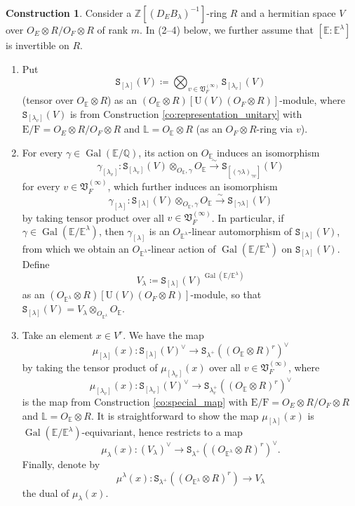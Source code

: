 \documentclass[12pt]{amsart}
\numberwithin{equation}{section}
\theoremstyle{plain}
\theoremstyle{definition}
\newtheorem{construction}[proposition]{Construction}
\theoremstyle{remark}
\renewcommand{\d}[1]{\mathbb{#1}}
\newcommand{\f}[1]{\mathfrak{#1}}
\renewcommand{\r}[1]{\mathrm{#1}}
\renewcommand{\(}{\left(}
\renewcommand{\)}{\right)}
\newcommand{\dE}{\d E}
\newcommand{\dL}{\d L}
\newcommand{\dQ}{\d Q}
\newcommand{\dZ}{\d Z}
\newcommand{\fV}{\f V}
\newcommand{\rE}{\r E}
\newcommand{\rF}{\r F}
\newcommand{\rU}{\r U}
\newcommand{\tS}{\mathtt{S}}
\DeclareMathOperator{\Gal}{Gal}
\begin{document}
\begin{construction}\label{co:harmonic_function}
Consider a $\dZ[(D_E B_\lambda)^{-1}]$-ring $R$ and a hermitian space $V$ over $O_E\otimes R/O_F\otimes R$ of rank $m$. In (2--4) below, we further assume that $[\dE:\dE^\lambda]$ is invertible on $R$.
\begin{enumerate}
  \item Put
      \[
      \tS_{[\lambda]}(V)\coloneqq\bigotimes_{v\in\fV_F^{(\infty)}}\tS_{[\lambda_v]}(V)
      \]
      (tensor over $O_\dE\otimes R$) as an $(O_\dE\otimes R)[\rU(V)(O_F\otimes R)]$-module, where $\tS_{[\lambda_v]}(V)$ is from Construction \ref{co:representation_unitary} with $\rE/\rF=O_E\otimes R/O_F\otimes R$ and $\dL=O_\dE\otimes R$ (as an $O_F\otimes R$-ring via $v$).

  \item For every $\gamma\in\Gal(\dE/\dQ)$, its action on $O_\dE$ induces an isomorphism
      \[
      \gamma_{[\lambda_v]}\colon\tS_{[\lambda_v]}(V)\otimes_{O_\dE,\gamma}O_\dE\xrightarrow\sim\tS_{[(\gamma\lambda)_{\gamma v}]}(V)
      \]
      for every $v\in\fV_F^{(\infty)}$, which further induces an isomorphism
      \[
      \gamma_{[\lambda]}\colon\tS_{[\lambda]}(V)\otimes_{O_\dE,\gamma}O_\dE\xrightarrow\sim\tS_{[\gamma\lambda]}(V)
      \]
      by taking tensor product over all $v\in\fV_F^{(\infty)}$. In particular, if $\gamma\in\Gal(\dE/\dE^\lambda)$, then $\gamma_{[\lambda]}$ is an $O_{\dE^\lambda}$-linear automorphism of $\tS_{[\lambda]}(V)$, from which we obtain an $O_{\dE^\lambda}$-linear action of $\Gal(\dE/\dE^\lambda)$ on $\tS_{[\lambda]}(V)$. Define
      \[
      V_\lambda\coloneqq\tS_{[\lambda]}(V)^{\Gal(\dE/\dE^\lambda)}
      \]
      as an $(O_{\dE^\lambda}\otimes R)[\rU(V)(O_F\otimes R)]$-module, so that $\tS_{[\lambda]}(V)=V_\lambda\otimes_{O_{\dE^\lambda}}O_\dE$.

  \item Take an element $x\in V^r$. We have the map
      \[
      \mu_{[\lambda]}(x)\colon\tS_{[\lambda]}(V)^\vee\to\tS_{\lambda^+}((O_\dE\otimes R)^r)^\vee
      \]
      by taking the tensor product of $\mu_{[\lambda_v]}(x)$ over all $v\in\fV_F^{(\infty)}$, where
      \[
      \mu_{[\lambda_v]}(x)\colon\tS_{[\lambda_v]}(V)^\vee\to\tS_{\lambda_v^+}((O_\dE\otimes R)^r)^\vee
      \]
      is the map from Construction \ref{co:special_map} with $\rE/\rF=O_E\otimes R/O_F\otimes R$ and $\dL=O_\dE\otimes R$. It is straightforward to show the map $\mu_{[\lambda]}(x)$ is $\Gal(\dE/\dE^\lambda)$-equivariant, hence restricts to a map
      \[
      \mu_\lambda(x)\colon(V_\lambda)^\vee\to\tS_{\lambda^+}((O_{\dE^\lambda}\otimes R)^r)^\vee.
      \]
      Finally, denote by
      \[
      \mu^\lambda(x)\colon\tS_{\lambda^+}((O_{\dE^\lambda}\otimes R)^r)\to V_\lambda
      \]
      the dual of $\mu_\lambda(x)$.


\end{enumerate}
\end{construction}
\end{document}
